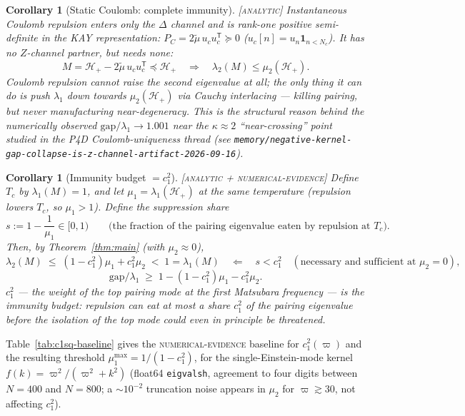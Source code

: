 \documentclass[11pt]{article}
\newtheorem{corollary}[theorem]{Corollary}
\newcommand{\HH}{\mathcal{H}}
\begin{document}
\begin{corollary}[Static Coulomb: complete immunity]\label{cor:static}
\textup{\textsc{[analytic]}} Instantaneous Coulomb repulsion enters only the
$\Delta$ channel and is rank-one positive semi-definite in the KAY
representation: $P_C=2\tilde\mu\, u_c u_c^{\mathsf T}\succeq0$
($u_c[n]=u_n\mathbf 1_{n<N_c}$). It has no $Z$-channel partner, but needs
none:
\[
 M=\HH_+-2\tilde\mu\,u_cu_c^{\mathsf T}\preceq\HH_+ \quad\Longrightarrow\quad \lambda_2(M)\le\mu_2(\HH_+).
\]
Coulomb repulsion \emph{cannot} raise the second eigenvalue at all; the only
thing it can do is push $\lambda_1$ down towards $\mu_2(\HH_+)$ via Cauchy
interlacing --- killing pairing, but never manufacturing near-degeneracy.
This is the structural reason behind the numerically observed
$\mathrm{gap}/\lambda_1\to1.001$ near the $\kappa\approx2$ ``near-crossing''
point studied in the P4D Coulomb-uniqueness thread (see
\texttt{memory/negative-kernel-gap-collapse-is-z-channel-artifact-2026-09-16}).
\end{corollary}

\begin{corollary}[Immunity budget $=c_1^2$]\label{cor:budget}
\textup{\textsc{[analytic + numerical-evidence]}} Define $T_c$ by
$\lambda_1(M)=1$, and let $\mu_1=\lambda_1(\HH_+)$ at the \emph{same}
temperature (repulsion lowers $T_c$, so $\mu_1>1$). Define the suppression
share
\[
 s:=1-\frac1{\mu_1}\in[0,1) \qquad\text{(the fraction of the pairing
 eigenvalue eaten by repulsion at $T_c$)}.
\]
Then, by Theorem~\ref{thm:main} (with $\mu_2\approx0$),
\[
 \lambda_2(M)\;\le\;(1-c_1^2)\mu_1+c_1^2\mu_2\;<\;1=\lambda_1(M)
 \quad\Longleftarrow\quad s<c_1^2 \quad(\text{necessary and sufficient at }\mu_2=0),
\]
\[
 \mathrm{gap}/\lambda_1 \;\ge\; 1-(1-c_1^2)\mu_1-c_1^2\mu_2.
\]
$c_1^2$ --- the weight of the top pairing mode at the first Matsubara
frequency --- \emph{is} the immunity budget: repulsion can eat at most a
share $c_1^2$ of the pairing eigenvalue before the isolation of the top mode
could even in principle be threatened.
\end{corollary}

Table~\ref{tab:c1sq-baseline} gives the \textsc{numerical-evidence} baseline
for $c_1^2(\varpi)$ and the resulting threshold $\mu_1^{\max}=1/(1-c_1^2)$, for
the single-Einstein-mode kernel $f(k)=\varpi^2/(\varpi^2+k^2)$ (float64
\texttt{eigvalsh}, agreement to four digits between $N=400$ and $N=800$; a
$\sim10^{-2}$ truncation noise appears in $\mu_2$ for $\varpi\gtrsim30$, not
affecting $c_1^2$).
\end{document}
